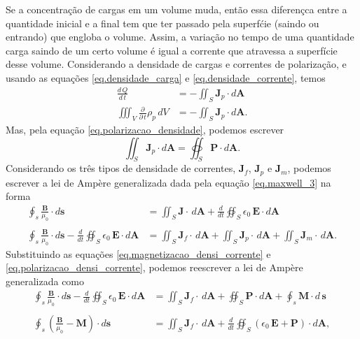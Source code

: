 Se a concentra\c{c}\~ao de cargas em um volume muda, ent\~ao essa diferen\c{c}ca entre a quantidade inicial e a final tem que ter passado pela superf\'cie (saindo ou entrando) que engloba o volume. Assim, a varia\c{c}\~ao no tempo de uma quantidade carga saindo de um certo volume \'e igual a corrente que atravessa a superf\'icie desse volume. Considerando a densidade de cargas e correntes de polariza\c{c}\~ao, e usando as equa\c{c}\~oes \ref{eq.densidade_carga} e \ref{eq.densidade_corrente}, temos
\begin{align*}
\frac{d\,Q}{d\,t}&=-\iint_S\mathbf{J}_p\cdot d\mathbf{A}\\
\iiint_V\frac{\partial}{\partial\,t}\rho_p\,dV&=-\iint_S\mathbf{J}_p\cdot d\mathbf{A}.
\end{align*}
Mas, pela equa\c{c}\~ao \ref{eq.polarizacao_densidade}, podemos escrever
\begin{equation}\label{eq.polarizacao_densi_corrente}
\iint_S\mathbf{J}_p\cdot d\mathbf{A}=\oiint_S\mathbf{P}\cdot d\mathbf{A}.
\end{equation} 
Considerando os tr\^es tipos de densidade de correntes, $\mathbf{J}_f$, $\mathbf{J}_p$ e $\mathbf{J}_m$, podemos escrever a lei de Amp\`ere generalizada dada pela equa\c{c}\~ao \ref{eq.maxwell_3} na forma
\begin{align*}
\oint_s\frac{\mathbf{B}}{\mu_0}\cdot d\mathbf{s}&=\iint_S\mathbf{J}\cdot\,d\mathbf{A}+\frac{d}{dt}\oiint_S\epsilon_0\,\textbf{E}\cdot\textit{d}\textbf{A}\\\\
\oint_s\frac{\mathbf{B}}{\mu_0}\cdot d\mathbf{s}-\frac{d}{dt}\oiint_S\epsilon_0\,\textbf{E}\cdot\textit{d}\textbf{A}&=\iint_S\mathbf{J}_f\cdot\,d\mathbf{A}+\iint_S\mathbf{J}_p\cdot\,d\mathbf{A}+\iint_S\mathbf{J}_m\cdot\,d\mathbf{A}.
\end{align*}
Substituindo as equa\c{c}\~oes \ref{eq.magnetizacao_densi_corrente} e \ref{eq.polarizacao_densi_corrente}, podemos reescrever a lei de Amp\`ere generalizada como
\begin{align*}
\oint_s\frac{\mathbf{B}}{\mu_0}\cdot d\mathbf{s}-\frac{d}{dt}\oiint_S\epsilon_0\,\textbf{E}\cdot\textit{d}\textbf{A}&=\iint_S\mathbf{J}_f\cdot\,d\mathbf{A}+\oiint_S\mathbf{P}\cdot d\mathbf{A}+\oint_s \mathbf{M}\cdot d\,\mathbf{s}\\\\
\oint_s\left(\frac{\mathbf{B}}{\mu_0}-\mathbf{M}\right)\cdot d\mathbf{s}&=\iint_S\mathbf{J}_f\cdot\,d\mathbf{A}+\frac{d}{dt}\oiint_S(\epsilon_0\,\textbf{E}+\mathbf{P})\cdot\textit{d}\textbf{A},
\end{align*}
